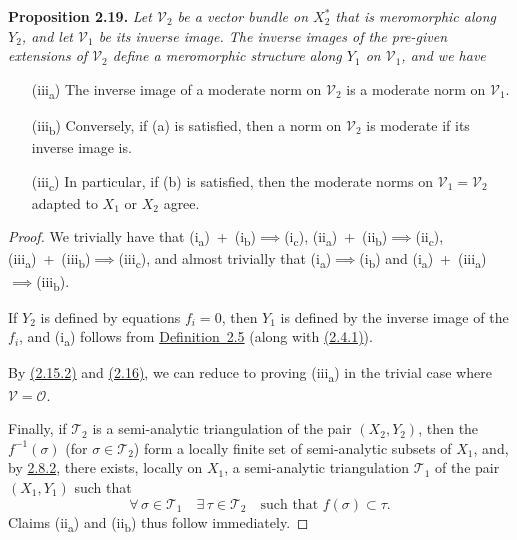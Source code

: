 \documentclass{report}
\newenvironment{itenv}[1]
  {\phantomsection\par\medskip\noindent\textbf{#1.}\itshape}
  {\par\medskip}
\newcommand{\scr}[1]{{\mathscr{#1}}}
\renewcommand{\cal}[1]{{\mathcal{#1}}}
\newcommand{\oldpage}[1]{\marginpar{\footnotesize$\Big\vert$ \textit{p.~#1}}}
\begin{document}
\begin{itenv}{Proposition 2.19}
  Let $\cal{V}_2$ be a vector bundle on $X_2^*$ that is meromorphic along $Y_2$, and let $\cal{V}_1$ be its inverse image.
  The inverse images of the pre-given extensions of $\cal{V}_2$ define a meromorphic structure along $Y_1$ on $\cal{V}_1$, and we have
  \begin{enumerate}
    \item[{\rm(iii\textsubscript{a})}] The inverse image of a moderate norm on $\cal{V}_2$ is a moderate norm on $\cal{V}_1$.
    \item[{\rm(iii\textsubscript{b})}] Conversely, if {\rm(a)} is satisfied, then a norm on $\cal{V}_2$ is moderate if its inverse image is.
    \item[{\rm(iii\textsubscript{c})}] In particular, if {\rm(b)} is satisfied, then the moderate norms on $\cal{V}_1=\cal{V}_2$ adapted to $X_1$ or $X_2$ agree.
  \end{enumerate}
\end{itenv}

\begin{proof}
  We trivially have that \mbox{(i\textsubscript{a})~+~(i\textsubscript{b})$\implies$(i\textsubscript{c})}, \mbox{(ii\textsubscript{a})~+~(ii\textsubscript{b})$\implies$(ii\textsubscript{c})}, \mbox{(iii\textsubscript{a})~+~(iii\textsubscript{b})$\implies$(iii\textsubscript{c})}, and almost trivially that \mbox{(i\textsubscript{a})$\implies$(i\textsubscript{b})} and \mbox{(i\textsubscript{a})~+~(iii\textsubscript{a})$\implies$(iii\textsubscript{b})}.

  If $Y_2$ is defined by equations $f_i=0$, then $Y_1$ is defined by the inverse image of the $f_i$, and (i\textsubscript{a}) follows from \hyperref[II.2.5]{Definition~2.5} (along with \hyperref[II.2.4.1]{(2.4.1)}).

  By \hyperref[II.2.15.2]{(2.15.2)} and \hyperref[II.2.16]{(2.16)}, we can reduce to proving (iii\textsubscript{a}) in the trivial case where $\cal{V}=\cal{O}$.

\oldpage{70}
  Finally, if $\scr{T}_2$ is a semi-analytic triangulation of the pair $(X_2,Y_2)$, then the $f^{-1}(\sigma)$ (for $\sigma\in\scr{T}_2$) form a locally finite set of semi-analytic subsets of $X_1$, and, by \hyperref[II.2.8.2]{2.8.2}, there exists, locally on $X_1$, a semi-analytic triangulation $\scr{T}_1$ of the pair $(X_1,Y_1)$ such that
  \[
    \forall\,\sigma\in\scr{T}_1
    \quad
    \exists\,\tau\in\scr{T}_2
    \quad
    \mbox{such that $f(\sigma)\subset\tau$}.
  \]
  Claims {\rm(ii\textsubscript{a})} and {\rm(ii\textsubscript{b})} thus follow immediately.
\end{proof}
\end{document}
